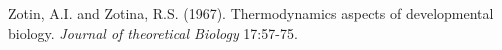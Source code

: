 \documentclass[11pt,letterpaper,]{paper}
\begin{document}
Zotin, A.I. and Zotina, R.S. (1967). Thermodynamics aspects of
developmental biology. \emph{Journal of theoretical Biology} 17:57-75.

\begin{verbatim}
\end{verbatim}





 




 

\printbibliography







% 

%  

\end{document}
